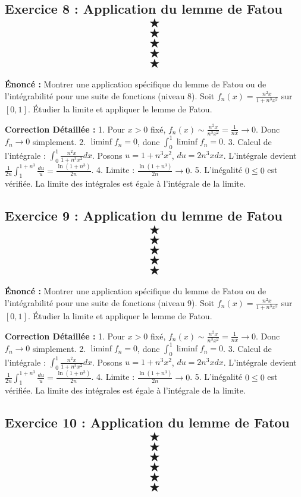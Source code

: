 \documentclass[11pt,a4paper]{article}
\begin{document}
\subsection*{Exercice 8 : Application du lemme de Fatou $$\bigstar$$$$\bigstar$$$$\bigstar$$$$\bigstar$$$$\bigstar$$}

\textbf{Énoncé :}
Montrer une application spécifique du lemme de Fatou ou de l'intégrabilité pour une suite de fonctions (niveau 8).
Soit $f_n(x) = \frac{n^2 x}{1 + n^3 x^2}$ sur $[0, 1]$.
Étudier la limite et appliquer le lemme de Fatou.

\textbf{Correction Détaillée :}
1. Pour $x > 0$ fixé, $f_n(x) \sim \frac{n^2 x}{n^3 x^2} = \frac{1}{n x} \to 0$. Donc $f_n \to 0$ simplement.
2. $\liminf f_n = 0$, donc $\int_0^1 \liminf f_n = 0$.
3. Calcul de l'intégrale : $\int_0^1 \frac{n^2 x}{1 + n^3 x^2} dx$.
   Posons $u = 1 + n^3 x^2$, $du = 2 n^3 x dx$.
   L'intégrale devient $\frac{1}{2n} \int_1^{1+n^3} \frac{du}{u} = \frac{\ln(1+n^3)}{2n}$.
4. Limite : $\frac{\ln(1+n^3)}{2n} \to 0$.
5. L'inégalité $0 \le 0$ est vérifiée. La limite des intégrales est égale à l'intégrale de la limite.


\subsection*{Exercice 9 : Application du lemme de Fatou $$\bigstar$$$$\bigstar$$$$\bigstar$$$$\bigstar$$$$\bigstar$$}

\textbf{Énoncé :}
Montrer une application spécifique du lemme de Fatou ou de l'intégrabilité pour une suite de fonctions (niveau 9).
Soit $f_n(x) = \frac{n^2 x}{1 + n^3 x^2}$ sur $[0, 1]$.
Étudier la limite et appliquer le lemme de Fatou.

\textbf{Correction Détaillée :}
1. Pour $x > 0$ fixé, $f_n(x) \sim \frac{n^2 x}{n^3 x^2} = \frac{1}{n x} \to 0$. Donc $f_n \to 0$ simplement.
2. $\liminf f_n = 0$, donc $\int_0^1 \liminf f_n = 0$.
3. Calcul de l'intégrale : $\int_0^1 \frac{n^2 x}{1 + n^3 x^2} dx$.
   Posons $u = 1 + n^3 x^2$, $du = 2 n^3 x dx$.
   L'intégrale devient $\frac{1}{2n} \int_1^{1+n^3} \frac{du}{u} = \frac{\ln(1+n^3)}{2n}$.
4. Limite : $\frac{\ln(1+n^3)}{2n} \to 0$.
5. L'inégalité $0 \le 0$ est vérifiée. La limite des intégrales est égale à l'intégrale de la limite.


\subsection*{Exercice 10 : Application du lemme de Fatou $$\bigstar$$$$\bigstar$$$$\bigstar$$$$\bigstar$$$$\bigstar$$$$\bigstar$$}
\end{document}
